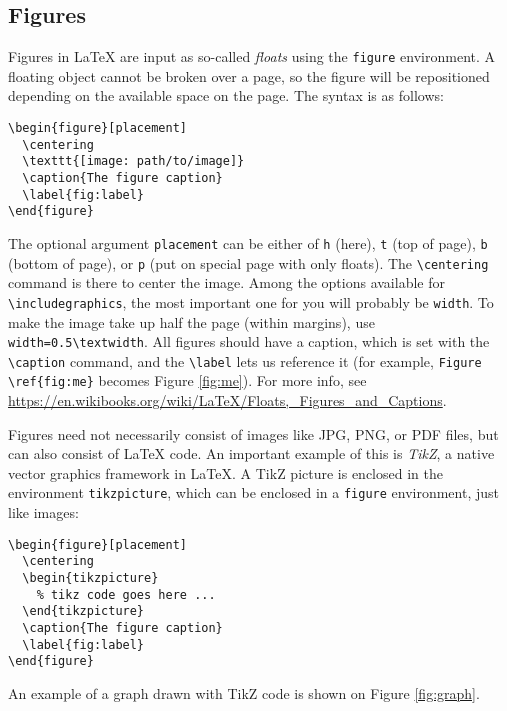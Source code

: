 \subsection{Figures}
\label{sec:figures}

Figures in \LaTeX{} are input as so-called \emph{floats} using the \texttt{figure} environment.
A floating object cannot be broken over a page, so the figure will be repositioned depending on the available space on the page.
The syntax is as follows:
%
\begin{verbatim}
\begin{figure}[placement]
  \centering
  \texttt{[image: path/to/image]}
  \caption{The figure caption}
  \label{fig:label}
\end{figure}
\end{verbatim}
%
The optional argument \texttt{placement} can be either of \texttt{h} (here), \texttt{t} (top of page), \texttt{b} (bottom of page), or \texttt{p} (put on special page with only floats).
The \verb!\centering! command is there to center the image.
Among the options available for \verb!\includegraphics!, the most important one for you will probably be \texttt{width}.
To make the image take up half the page (within margins), use \verb!width=0.5\textwidth!.
All figures should have a caption, which is set with the \verb!\caption! command, and the \verb!\label! lets us reference it (for example, \verb!Figure \ref{fig:me}! becomes Figure \ref{fig:me}).
For more info, see \url{https://en.wikibooks.org/wiki/LaTeX/Floats,_Figures_and_Captions}.



Figures need not necessarily consist of images like JPG, PNG, or PDF files, but can also consist of \LaTeX{} code.
An important example of this is \emph{TikZ}, a native vector graphics framework in \LaTeX{}.
A TikZ picture is enclosed in the environment \texttt{tikzpicture}, which can be enclosed in a \texttt{figure} environment, just like images:
%
\begin{verbatim}
\begin{figure}[placement]
  \centering
  \begin{tikzpicture}
    % tikz code goes here ...
  \end{tikzpicture}
  \caption{The figure caption}
  \label{fig:label}
\end{figure}
\end{verbatim}
%
An example of a graph drawn with TikZ code is shown on Figure \ref{fig:graph}.

